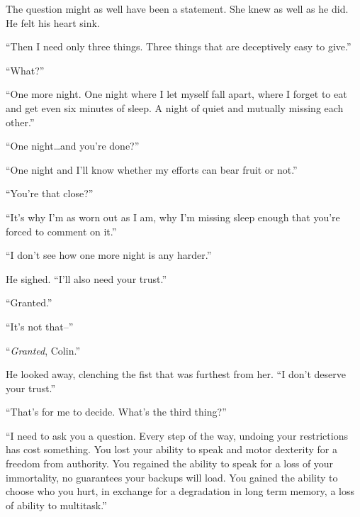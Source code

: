 The question might as well have been a statement.  She knew as well as he did.  He felt his heart sink.



``Then I need only three things.  Three things that are deceptively easy to give.''



``What?''



``One more night.  One night where I let myself fall apart, where I forget to eat and get even six minutes of sleep.  A night of quiet and mutually missing each other.''



``One night\ldots and you're done?''



``One night and I'll know whether my efforts can bear fruit or not.''



``You're that close?''



``It's why I'm as worn out as I am, why I'm missing sleep enough that you're forced to comment on it.''



``I don't see how one more night is any harder.''



He sighed.  ``I'll also need your trust.''



``Granted.''



``It's not that--''



``\emph{Granted}, Colin.''



He looked away, clenching the fist that was furthest from her.  ``I don't deserve your trust.''



``That's for me to decide.  What's the third thing?''



``I need to ask you a question.  Every step of the way, undoing your restrictions has cost something.  You lost your ability to speak and motor dexterity for a freedom from authority.  You regained the ability to speak for a loss of your immortality, no guarantees your backups will load.  You gained the ability to choose who you hurt, in exchange for a degradation in long term memory, a loss of ability to multitask.''



